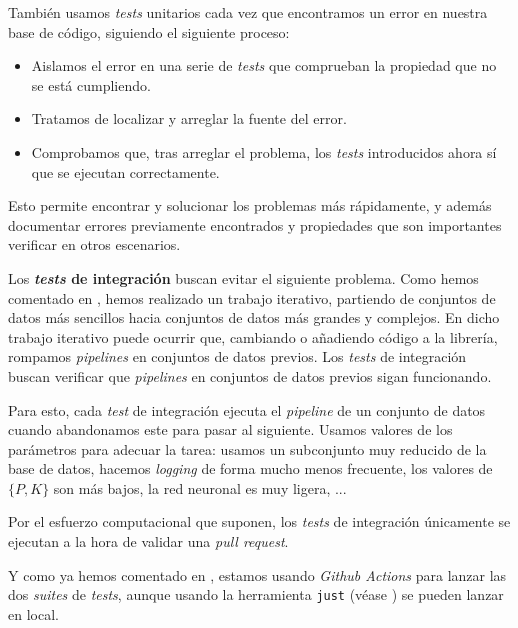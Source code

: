 También usamos \textit{tests} unitarios cada vez que encontramos un error en nuestra base de código, siguiendo el siguiente proceso:

\begin{itemize}
	\item Aislamos el error en una serie de \textit{tests} que comprueban la propiedad que no se está cumpliendo.
	\item Tratamos de localizar y arreglar la fuente del error.
	\item Comprobamos que, tras arreglar el problema, los \textit{tests} introducidos ahora sí que se ejecutan correctamente.
\end{itemize}

Esto permite encontrar y solucionar los problemas más rápidamente, y además documentar errores previamente encontrados y propiedades que son importantes verificar en otros escenarios.

Los \textbf{\textit{tests} de integración} buscan evitar el siguiente problema. Como hemos comentado en , hemos realizado un trabajo iterativo, partiendo de conjuntos de datos más sencillos hacia conjuntos de datos más grandes y complejos. En dicho trabajo iterativo puede ocurrir que, cambiando o añadiendo código a la librería, rompamos \textit{pipelines} en conjuntos de datos previos. Los \textit{tests} de integración buscan verificar que \textit{pipelines} en conjuntos de datos previos sigan funcionando.

Para esto, cada \textit{test} de integración ejecuta el \textit{pipeline} de un conjunto de datos cuando abandonamos este para pasar al siguiente. Usamos valores de los parámetros para adecuar la tarea: usamos un subconjunto muy reducido de la base de datos, hacemos \textit{logging} de forma mucho menos frecuente, los valores de $\{P, K\}$ son más bajos, la red neuronal es muy ligera, ...

Por el esfuerzo computacional que suponen, los \textit{tests} de integración únicamente se ejecutan a la hora de validar una \textit{pull request}.

Y como ya hemos comentado en , estamos usando \textit{Github Actions} para lanzar las dos \textit{suites} de \textit{tests}, aunque usando la herramienta \lstinline{just} (véase ) se pueden lanzar en local.
